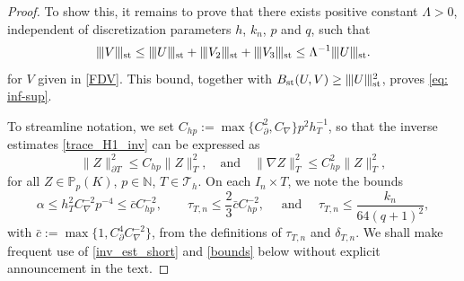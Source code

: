 \documentclass{amsart}
\newcommand{\norm}[2]{\|{#1}\|_{{#2}}}
\newcommand{\Th}{\mathcal{T}_h}
\newcommand{\ndg}[1]{|\kern-.03cm \|{#1}|\kern-.03cm \|}
\newcommand{\cinvT}{C_{\partial}}
\newcommand{\cinv}{C_{\nabla}}
\newcommand{\chp}{C_{hp}}
\theoremstyle{definition}
\theoremstyle{remark}
\numberwithin{equation}{section}
\begin{document}
\begin{proof}
	To show this, it remains to prove that  there exists positive constant $\Lambda>0$, independent of discretization parameters $h$, $k_n$, $p$ and $q$, such that
	\begin{equation}\label{eq: upper bound}
		\ndg{V}_{\rm st}
		\leq \ndg{U}_{\rm st} + \ndg{V_2 }_{\rm st}+ \ndg{V_3}_{\rm st} \leq \Lambda^{-1}  \ndg{U}_{\rm st}.
	\end{equation}
for $V$ given in \eqref{FDV}.  This bound, together with  $B_{\rm st}(U,V)
\geq
\ndg{U}_{\rm st}^2$, proves \eqref{eq: inf-sup}.


To streamline notation, we set $\chp:= \max\{\cinvT^2,\cinv\} p^2 h_T^{-1}$, so that the inverse estimates \eqref{trace_H1_inv} can be expressed as
\begin{equation}\label{inv_est_short}
	\norm{Z}{\partial T}^2 \leq \chp  \norm{Z}{ T}^2,\quad\text{and}\quad
	\norm{\nabla Z}{T}^2 \leq  \chp^2 \norm{Z}{ T}^2,
\end{equation}
for all $Z\in\mathbb{P}_p(K)$, $p\in\mathbb{N}$, $T\in\Th $.  On each $I_n\times T$, we note the bounds
\begin{equation}\label{bounds}
	\alpha \le h_T^2\cinv^{-2}p^{-4} \leq \bar{c}\chp^{-2},\qquad  \tau_{T,n}\le \frac{2}{3}\bar{c}\chp^{-2}, \quad \text{ and }\quad
\tau_{T,n}\le
\frac{k_n}{64(q+1)^2},
\end{equation}
with $\bar{c}:=\max\{1,\cinvT^4\cinv^{-2}\}$, from the definitions of $\tau_{T,n}$ and $\delta_{T,n}$. We shall make frequent use of \eqref{inv_est_short} and \eqref{bounds} below without explicit announcement in the text.





\end{proof}
\end{document}
